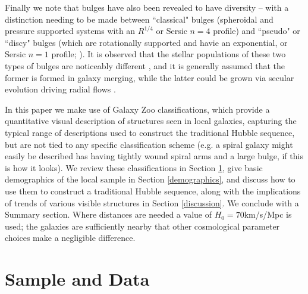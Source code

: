 \documentclass[usenatbib]{mn2e}
\begin{document}
Finally we note that bulges have also been revealed to have diversity -- with a distinction needing to be made between ``classical" bulges (spheroidal and pressure supported systems with an $R^{1/4}$ or Sersic $n=4$ profile) and ``pseudo" or ``discy" bulges (which are rotationally supported and havie an exponential, or Sersic $n=1$ profile; \citealt{gadotti2009,kormendykennicutt2004}). It is observed that the stellar populations of these two types of bulges are noticeably different \citep{FisherDrory}, and it is generally assumed that the former is formed in galaxy merging, while the latter could be grown via secular evolution driving radial flows \citep[e.g.][]{gadotti2009}. 

In this paper we make use of Galaxy Zoo classifications, which provide a quantitative visual description of structures seen in local galaxies, capturing the typical range of descriptions used to construct the traditional Hubble sequence, but are not tied to any specific classification scheme (e.g. a spiral galaxy might easily be described has having tightly wound spiral arms and a large bulge, if this is how it looks). We review these classifications in Section \ref{sample}, give basic demographics of the local sample in Section \ref{demographics}, and discuss how to use them to construct a traditional Hubble sequence, along with the implications of trends of various visible structures in Section \ref{discussion}. We conclude with a Summary section. Where distances are needed a value of $H_0 = 70$km/s/Mpc is used; the galaxies are sufficiently nearby that other cosmological parameter choices make a negligible difference. 



\section{Sample and Data} \label{sample}
\end{document}

